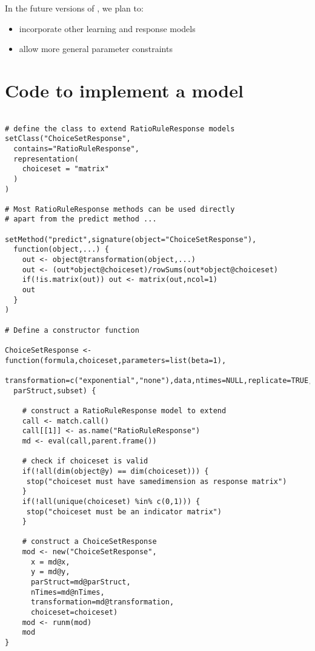 \documentclass[doc]{apa}
\newcommand{\code}[1]{{\ttfamily{#1}}}
\begin{document}
In the future versions of \code{mcplR}, we plan to:
\begin{itemize}
\item incorporate other learning and response models
\item allow more general parameter constraints
\end{itemize}



\appendix

\section{Code to implement a \code{ChoiceSetResponse} model}

\begin{verbatim}

# define the class to extend RatioRuleResponse models
setClass("ChoiceSetResponse",
  contains="RatioRuleResponse",
  representation(
    choiceset = "matrix"
  )
)

# Most RatioRuleResponse methods can be used directly
# apart from the predict method ...
  
setMethod("predict",signature(object="ChoiceSetResponse"),
  function(object,...) {
    out <- object@transformation(object,...)
    out <- (out*object@choiceset)/rowSums(out*object@choiceset)
    if(!is.matrix(out)) out <- matrix(out,ncol=1)
    out
  }
)

# Define a constructor function

ChoiceSetResponse <- function(formula,choiceset,parameters=list(beta=1),
  transformation=c("exponential","none"),data,ntimes=NULL,replicate=TRUE,fixed,
  parStruct,subset) {

    # construct a RatioRuleResponse model to extend
    call <- match.call()
    call[[1]] <- as.name("RatioRuleResponse")
    md <- eval(call,parent.frame())
  
    # check if choiceset is valid
    if(!all(dim(object@y) == dim(choiceset))) {
     stop("choiceset must have samedimension as response matrix")
    }
    if(!all(unique(choiceset) %in% c(0,1))) {
     stop("choiceset must be an indicator matrix")
    }
    
    # construct a ChoiceSetResponse
    mod <- new("ChoiceSetResponse",
      x = md@x,
      y = md@y,
      parStruct=md@parStruct,
      nTimes=md@nTimes,
      transformation=md@transformation,
      choiceset=choiceset)
    mod <- runm(mod)
    mod            
}
\end{verbatim}
\end{document}
